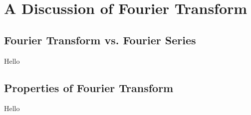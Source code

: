 \chapter{A Discussion of Fourier Transform}

\section{Fourier Transform vs. Fourier Series}
Hello

\section{Properties of Fourier Transform}
Hello
